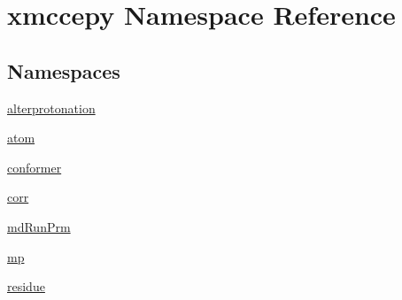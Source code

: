 \hypertarget{namespacexmccepy}{\section{xmccepy Namespace Reference}
\label{namespacexmccepy}
}
\subsection*{Namespaces}
\begin{DoxyCompactItemize}
\item 
\hyperlink{namespacexmccepy_1_1alterprotonation}{alterprotonation}
\item 
\hyperlink{namespacexmccepy_1_1atom}{atom}
\item 
\hyperlink{namespacexmccepy_1_1conformer}{conformer}
\item 
\hyperlink{namespacexmccepy_1_1corr}{corr}
\item 
\hyperlink{namespacexmccepy_1_1md_run_prm}{md\-Run\-Prm}
\item 
\hyperlink{namespacexmccepy_1_1mp}{mp}
\item 
\hyperlink{namespacexmccepy_1_1residue}{residue}
\end{DoxyCompactItemize}
